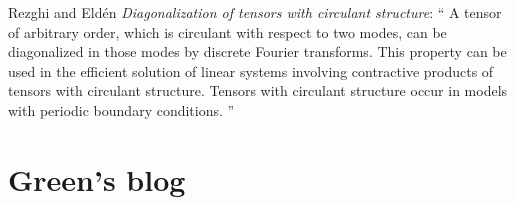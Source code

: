 \begin{description}
{Rezghi and Eld{\'{e}}n
{\em Diagonalization of tensors with circulant structure}: ``
A tensor of arbitrary order, which is circulant with respect to two
modes, can be diagonalized in those modes by discrete Fourier transforms. This
property can be used in the efficient solution of linear systems involving
contractive products of tensors with circulant structure. Tensors with
circulant structure occur in models with periodic boundary
conditions.
''


    }



\end{description}


\section{Green's blog}
\label{sect:blog2dGreen}

